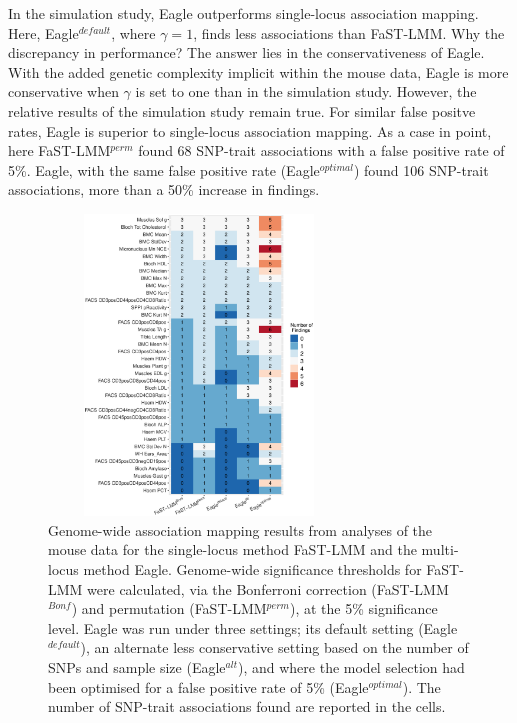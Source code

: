 \documentclass{bioinfo}
\begin{document}
In the simulation study, Eagle outperforms single-locus association mapping. Here, Eagle$^{default}$, where $\gamma=1$, finds less associations 
than FaST-LMM. Why the discrepancy in performance?   The answer lies in the conservativeness of Eagle.  With the added genetic complexity implicit within the mouse data, Eagle is more conservative when $\gamma$ is set to one than in the simulation study.  However, the relative results of the simulation study remain true. For similar false positve rates, Eagle is superior to single-locus association mapping. As a case in point, here FaST-LMM$^{perm}$ found 68 SNP-trait associations with a false positive rate of 5\%. Eagle, with the same false positive rate (Eagle$^{optimal}$) found 106 SNP-trait associations, more 
than a 50\% increase in findings. 







\begin{figure}[!tpb]
\centerline{\includegraphics[width=8cm, height=8cm]{mouseresults.eps}}
\caption{
Genome-wide association mapping results from analyses of the mouse data for the single-locus method FaST-LMM and the 
multi-locus method Eagle. Genome-wide significance thresholds for FaST-LMM were calculated, via the Bonferroni correction 
(FaST-LMM$^{Bonf}$) and permutation (FaST-LMM$^{perm}$), at the 5\% significance level.  Eagle was run under three settings; its default setting (Eagle$^{default}$),  an alternate less conservative setting based on the number of SNPs and sample size (Eagle$^{alt}$), and where the model selection had been optimised for a false positive rate of 5\% (Eagle$^{optimal}$).   The number of SNP-trait associations found are reported in the cells. }
\label{figmouse}

\end{figure}
\end{document}
